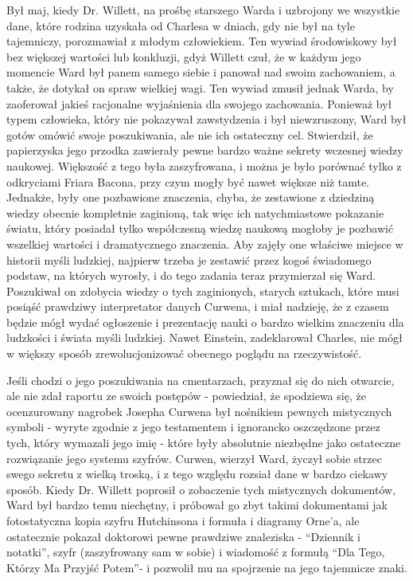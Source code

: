 Był maj, kiedy Dr. Willett, na prośbę starszego Warda i uzbrojony we wszystkie dane, które rodzina uzyskała od Charlesa w dniach, gdy nie był na tyle tajemniczy, porozmawiał z młodym człowiekiem. Ten wywiad środowiskowy był bez większej wartości lub konkluzji, gdyż Willett czuł, że w każdym jego momencie Ward był panem samego siebie i panował nad swoim zachowaniem, a także, że dotykał on spraw wielkiej wagi. Ten wywiad zmusił jednak Warda, by zaoferował jakieś racjonalne wyjaśnienia dla swojego zachowania. Ponieważ był typem człowieka, który nie pokazywał zawstydzenia i był niewzruszony, Ward był gotów omówić swoje poszukiwania, ale nie ich ostateczny cel. Stwierdził, że papierzyska jego przodka zawierały pewne bardzo ważne sekrety wczesnej wiedzy naukowej. Większość z tego była zaszyfrowana, i można je było porównać tylko z odkryciami Friara Bacona, przy czym mogły być nawet większe niż tamte. Jednakże, były one pozbawione znaczenia, chyba, że zestawione z dziedziną wiedzy obecnie kompletnie zaginioną, tak więc ich natychmiastowe pokazanie światu, który posiadał tylko współczesną wiedzę naukową mogłoby je pozbawić wszelkiej wartości i dramatycznego znaczenia. Aby zajęły one właściwe miejsce w historii myśli ludzkiej, najpierw trzeba je zestawić przez kogoś świadomego podstaw, na których wyrosły, i do tego zadania teraz przymierzał się Ward. Poszukiwał on zdobycia wiedzy o tych zaginionych, starych sztukach, które musi posiąść prawdziwy interpretator danych Curwena, i miał nadzieję, że z czasem będzie mógł wydać ogłoszenie i prezentację nauki o bardzo wielkim znaczeniu dla ludzkości i świata myśli ludzkiej. Nawet Einstein, zadeklarował Charles, nie mógł w większy sposób zrewolucjonizować obecnego poglądu na rzeczywistość. 

Jeśli chodzi o jego poszukiwania na cmentarzach, przyznał się do nich otwarcie, ale nie zdał raportu ze swoich postępów - powiedział, że spodziewa się, że ocenzurowany nagrobek Josepha Curwena był nośnikiem pewnych mistycznych symboli - wyryte zgodnie z jego testamentem i ignorancko oszczędzone przez tych, który wymazali jego imię - które były absolutnie niezbędne jako ostateczne rozwiązanie jego systemu szyfrów. Curwen, wierzył Ward, życzył sobie strzec swego sekretu z wielką troską, i z tego względu rozsiał dane w bardzo ciekawy sposób. Kiedy Dr. Willett poprosił o zobaczenie tych mistycznych dokumentów, Ward był bardzo temu niechętny, i próbował go zbyt takimi dokumentami jak fotostatyczna kopia szyfru Hutchinsona i formuła i diagramy Orne'a, ale ostatecznie pokazał doktorowi pewne prawdziwe znaleziska - ``Dziennik i notatki'', szyfr (zaszyfrowany sam w sobie) i wiadomość z formułą ``Dla Tego, Którzy Ma Przyjść Potem''- i pozwolił mu na spojrzenie na jego tajemnicze znaki. 

